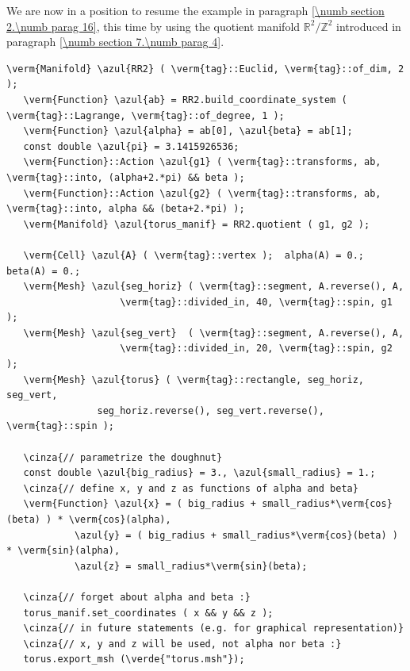 We are now in a position to resume the example in paragraph \ref{\numb section 2.\numb parag 16},
this time by using the quotient manifold $ \mathbb{R}^2/{\mathbb Z}^2 $ introduced in paragraph
\ref{\numb section 7.\numb parag 4}.

\begin{Verbatim}[commandchars=\\\{\},formatcom=\small\tt,frame=single,
   label=parag-\ref{\numb section 7.\numb parag 5}.cpp,rulecolor=\color{coment},
   baselinestretch=0.94,framesep=2mm                                            ]
   \verm{Manifold} \azul{RR2} ( \verm{tag}::Euclid, \verm{tag}::of_dim, 2 );
   \verm{Function} \azul{ab} = RR2.build_coordinate_system ( \verm{tag}::Lagrange, \verm{tag}::of_degree, 1 );
   \verm{Function} \azul{alpha} = ab[0], \azul{beta} = ab[1];
   const double \azul{pi} = 3.1415926536;
   \verm{Function}::Action \azul{g1} ( \verm{tag}::transforms, ab, \verm{tag}::into, (alpha+2.*pi) && beta );
   \verm{Function}::Action \azul{g2} ( \verm{tag}::transforms, ab, \verm{tag}::into, alpha && (beta+2.*pi) );
   \verm{Manifold} \azul{torus_manif} = RR2.quotient ( g1, g2 );

   \verm{Cell} \azul{A} ( \verm{tag}::vertex );  alpha(A) = 0.;  beta(A) = 0.;
   \verm{Mesh} \azul{seg_horiz} ( \verm{tag}::segment, A.reverse(), A,
                    \verm{tag}::divided_in, 40, \verm{tag}::spin, g1 );
   \verm{Mesh} \azul{seg_vert}  ( \verm{tag}::segment, A.reverse(), A,
                    \verm{tag}::divided_in, 20, \verm{tag}::spin, g2 );
   \verm{Mesh} \azul{torus} ( \verm{tag}::rectangle, seg_horiz, seg_vert,
                seg_horiz.reverse(), seg_vert.reverse(), \verm{tag}::spin );

   \cinza{// parametrize the doughnut}
   const double \azul{big_radius} = 3., \azul{small_radius} = 1.;
   \cinza{// define x, y and z as functions of alpha and beta}
   \verm{Function} \azul{x} = ( big_radius + small_radius*\verm{cos}(beta) ) * \verm{cos}(alpha),
            \azul{y} = ( big_radius + small_radius*\verm{cos}(beta) ) * \verm{sin}(alpha),
            \azul{z} = small_radius*\verm{sin}(beta);

   \cinza{// forget about alpha and beta :}
   torus_manif.set_coordinates ( x && y && z );
   \cinza{// in future statements (e.g. for graphical representation)}
   \cinza{// x, y and z will be used, not alpha nor beta :}
   torus.export_msh (\verde{"torus.msh"});
\end{Verbatim}


